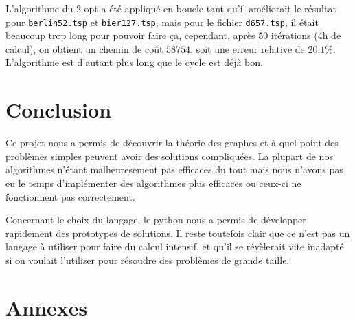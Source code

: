 \documentclass{scrartcl}
\begin{document}
    L'algorithme du 2-opt a été appliqué en boucle tant qu'il améliorait le
    résultat pour \verb+berlin52.tsp+ et \verb+bier127.tsp+, mais pour le
    fichier \verb+d657.tsp+, il était beaucoup trop long pour pouvoir faire ça,
    cependant, après 50 itérations (4h de calcul), on obtient un chemin de coût
    $58754$, soit une erreur relative de $20.1\%$. L'algorithme est d'autant
    plus long que le cycle est déjà bon.

\section{Conclusion}
  Ce projet nous a permis de découvrir la théorie des graphes et à quel point
  des problèmes simples peuvent avoir des solutions compliquées. La plupart de
  nos algorithmes n'étant malheuresement pas efficaces du tout mais nous n'avons
  pas eu le temps d'implémenter des algorithmes plus efficaces ou ceux-ci ne
  fonctionnent pas correctement.

  Concernant le choix du langage, le python nous a permis de développer
  rapidement des prototypes de solutions. Il reste toutefois clair que ce
  n'est pas un langage à utiliser pour faire du calcul intensif, et qu'il se
  révèlerait vite inadapté si on voulait l'utiliser pour résoudre des problèmes
  de grande taille.

\section{Annexes}
  \lstlistoflistings
  
  
  
  
  
  
  
\end{document}
